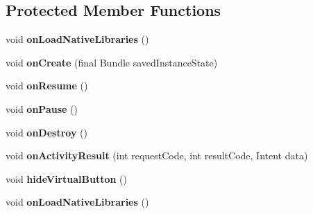\subsection*{Protected Member Functions}
\begin{DoxyCompactItemize}
\item 
\mbox{\label{classorg_1_1cocos2dx_1_1lib_1_1Cocos2dxActivity_a47fac874835c3be71dd1485e99dfc595}} 
void {\bfseries on\+Load\+Native\+Libraries} ()
\item 
\mbox{\label{classorg_1_1cocos2dx_1_1lib_1_1Cocos2dxActivity_a2717d252ff4066bf18d523baf3869cdc}} 
void {\bfseries on\+Create} (final Bundle saved\+Instance\+State)
\item 
\mbox{\label{classorg_1_1cocos2dx_1_1lib_1_1Cocos2dxActivity_a2dbb2d099fc3dfac9e5bee203d7eb5bc}} 
void {\bfseries on\+Resume} ()
\item 
\mbox{\label{classorg_1_1cocos2dx_1_1lib_1_1Cocos2dxActivity_adb64b0420c6db4e275aaae153d74d1c6}} 
void {\bfseries on\+Pause} ()
\item 
\mbox{\label{classorg_1_1cocos2dx_1_1lib_1_1Cocos2dxActivity_a2c1ffa79926ebd7fe5e2cde1ae92eed0}} 
void {\bfseries on\+Destroy} ()
\item 
\mbox{\label{classorg_1_1cocos2dx_1_1lib_1_1Cocos2dxActivity_a209050201964c75ddf004e30f1b6b063}} 
void {\bfseries on\+Activity\+Result} (int request\+Code, int result\+Code, Intent data)
\item 
\mbox{\label{classorg_1_1cocos2dx_1_1lib_1_1Cocos2dxActivity_a0a97c30f1171cff3ff39c1968bda2229}} 
void {\bfseries hide\+Virtual\+Button} ()
\item 
\mbox{\label{classorg_1_1cocos2dx_1_1lib_1_1Cocos2dxActivity_a47fac874835c3be71dd1485e99dfc595}} 
void {\bfseries on\+Load\+Native\+Libraries} ()
\item 

\end{DoxyCompactItemize}
